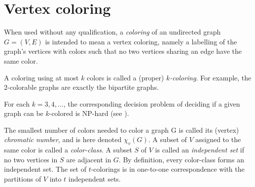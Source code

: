 \section{Vertex coloring}

When used without any qualification, a {\it coloring} of an
undirected graph $G=(V,E)$ is intended 
to mean a vertex coloring, namely a labelling of the graph's
vertices with colors such that no two vertices sharing an
edge have the same color.

A coloring using at most $k$ colors is called a (proper) {\it $k$-coloring}. 
For example, the $2$-colorable graphs are exactly the bipartite graphs.

\begin{remark}
For each $k=3,4,\dots$, the corresponding decision problem of deciding
if a given graph can be $k$-colored is NP-hard
(see \cite{JaegerEtAl1990}).
\end{remark}

The smallest number of colors needed to color a graph G is called 
its (vertex) {\it chromatic number}, and is here denoted $\chi_v(G)$. 
A subset of $V$ assigned to the same color is called a {\it color-class}.
A subset $S$ of $V$ is called an {\it independent set} if no two vertices
in $S$ are adjacent in $G$. By definition, every color-class forms 
an independent set. The set of $t$-colorings is in one-to-one
correspondence with the partitions of $V$ into $t$ independent sets.

